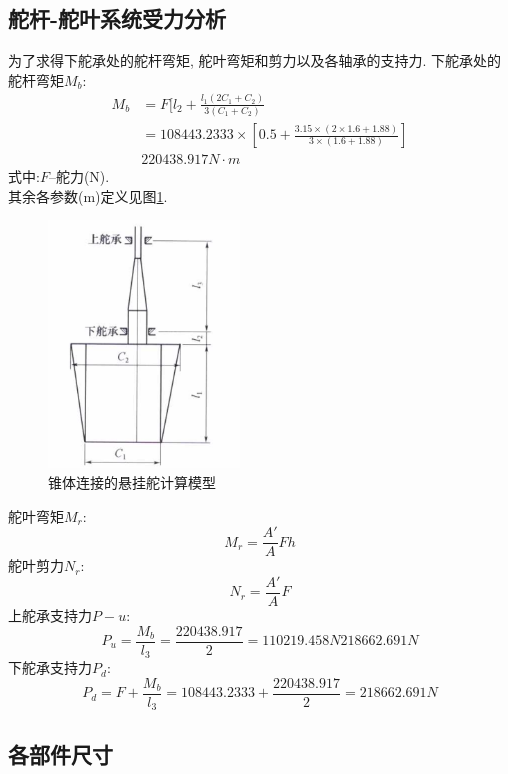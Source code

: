 \documentclass[a4paper,UTF8]{article}
\begin{document}
\subsection{舵杆-舵叶系统受力分析}
为了求得下舵承处的舵杆弯矩, 舵叶弯矩和剪力以及各轴承的支持力.
下舵承处的舵杆弯矩$M_{b}$:
\begin{equation}
\begin{split}
	M_{b}&=F[l_{2}+\frac{l_{1}(2C_{1}+C_{2})}{3(C_{1}+C_{2})}\\
		&=108443.2333\times[0.5+\frac{3.15\times(2\times 1.6+1.88)}{3\times(1.6+1.88)}]\\
		&220438.917 N\cdot m
\end{split}
\end{equation}
式中:$F$--舵力(N).\\其余各参数(m)定义见图\ref{fig:cal}.
\begin{figure}
	\centering
	\includegraphics[width=2in]{figure/calculate}
	\caption{锥体连接的悬挂舵计算模型}
	\label{fig:cal}
\end{figure}
舵叶弯矩$M_{r}$:
\begin{equation}
	M_{r}=\frac{A'}{A}Fh
\end{equation}
舵叶剪力$N_{r}$:
\begin{equation}
	N_{r}=\frac{A'}{A}F
\end{equation}
上舵承支持力$P-{u}$:
\begin{equation}
	P_{u}=\frac{M_{b}}{l_{3}}=\frac{220438.917}{2}=110219.458N218662.691N
\end{equation}
下舵承支持力$P_{d}$:
\begin{equation}
	P_{d}=F+\frac{M_{b}}{l_{3}}=108443.2333+\frac{220438.917}{2}=218662.691N
\end{equation}

\subsection{各部件尺寸}
\end{document}
